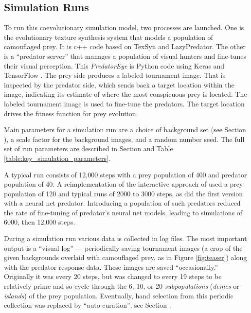 \documentclass[letterpaper]{article}
\newcommand{\jargon}[1]{\textit{#1}}
\newcommand{\texsyn}[0]{TexSyn}
\newcommand{\lazypredator}[0]{LazyPredator}
\newcommand{\predatoreye}[0]{PredatorEye}
\begin{document}
\subsection{Simulation Runs}
\label{subsec:simulation_runs}
To run this coevolutionary simulation model, two processes are launched. One is the evolutionary texture synthesis system that models a population of camouflaged prey. It is c++ code based on \texsyn{} and \lazypredator{}. The other is a ``predator server'' that manages a population of visual hunters and fine-tunes their visual perception. This \jargon{\predatoreye{}} \citep{reynolds_predatoreye_2021} is Python code using Keras \citep{chollet_keras_2015} and TensorFlow \citep{tensorflow_whitepaper_2015}. The prey side produces a labeled tournament image. That is inspected by the predator side, which sends back a target location within the image, indicating its estimate of where the most conspicuous prey is located. The labeled tournament image is used to fine-tune the predators. The target location drives the fitness function for prey evolution.
\par
Main parameters for a simulation run are a choice of background set (see Section ), a scale factor for the background images, and a random number seed. The full set of run parameters are described in Section  and Table \ref{table:key_simulation_parameters}.
\par
A typical run consists of 12,000 steps with a prey population of 400 and predator population of 40. A reimplementation of the interactive approach of \citet{reynolds_iec_2011} used a prey population of 120 and typical runs of 2000 to 3000 steps, as did the first version with a neural net predator. Introducing a population of such predators reduced the rate of fine-tuning of predator's neural net models, leading to simulations of 6000, then 12,000 steps.
\par
During a simulation run various data is collected in log files. The most important output is a ``visual log'' --- periodically saving tournament images (a crop of the given backgrounds overlaid with camouflaged prey, as in Figure \ref{fig:teaser}) along with the predator response data. These images are saved ``occasionally.'' Originally it was every 20 steps, but was changed to every 19 steps to be relatively prime and so cycle through the 6, 10, or 20 \jargon{subpopulations} (\jargon{demes} or \jargon{islands}) of the prey population. Eventually, hand selection from this periodic collection was replaced by ``auto-curation'', see Section .
\par
\end{document}
